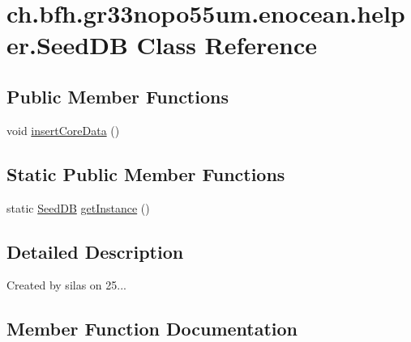 \hypertarget{classch_1_1bfh_1_1gr33nopo55um_1_1enocean_1_1helper_1_1_seed_d_b}{}\section{ch.\+bfh.\+gr33nopo55um.\+enocean.\+helper.\+Seed\+DB Class Reference}
\label{classch_1_1bfh_1_1gr33nopo55um_1_1enocean_1_1helper_1_1_seed_d_b}
\subsection*{Public Member Functions}
\begin{DoxyCompactItemize}
\item 
void \hyperlink{classch_1_1bfh_1_1gr33nopo55um_1_1enocean_1_1helper_1_1_seed_d_b_a08fea8281a49f2b4c2ea304a8678b5c6}{insert\+Core\+Data} ()
\end{DoxyCompactItemize}
\subsection*{Static Public Member Functions}
\begin{DoxyCompactItemize}
\item 
static \hyperlink{classch_1_1bfh_1_1gr33nopo55um_1_1enocean_1_1helper_1_1_seed_d_b}{Seed\+DB} \hyperlink{classch_1_1bfh_1_1gr33nopo55um_1_1enocean_1_1helper_1_1_seed_d_b_a165805fb6c25b60fee8331b0f95b918c}{get\+Instance} ()
\end{DoxyCompactItemize}


\subsection{Detailed Description}
Created by silas on 25... 

\subsection{Member Function Documentation}
\hypertarget{classch_1_1bfh_1_1gr33nopo55um_1_1enocean_1_1helper_1_1_seed_d_b_a165805fb6c25b60fee8331b0f95b918c}{}\label{classch_1_1bfh_1_1gr33nopo55um_1_1enocean_1_1helper_1_1_seed_d_b_a165805fb6c25b60fee8331b0f95b918c} 
